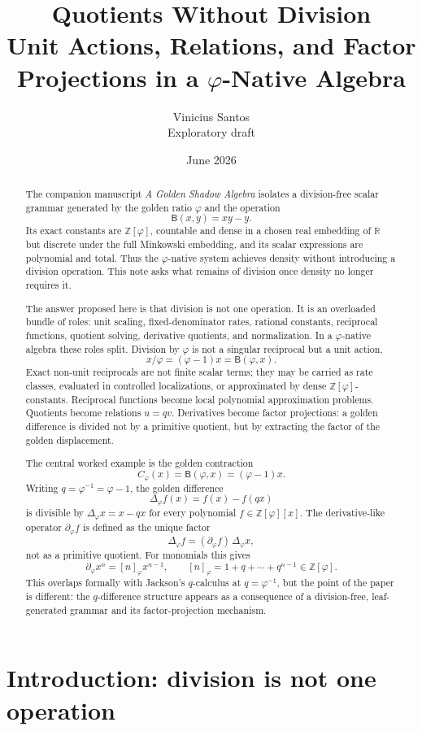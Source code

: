 \documentclass[11pt]{article}
\title{Quotients Without Division\\
\large Unit Actions, Relations, and Factor Projections in a $\varphi$-Native Algebra}
\author{Vinicius Santos\\
\small Exploratory draft}
\date{June 2026}
\newcommand{\B}{\mathsf{B}}
\newcommand{\ph}{\varphi}
\newcommand{\Z}{\mathbb{Z}}
\newcommand{\R}{\mathbb{R}}
\newcommand{\dd}{\Delta_\ph}
\newcommand{\pd}{\partial_\ph}
\newcommand{\Cphi}{C_\ph}
\begin{document}
\maketitle

\begin{abstract}
The companion manuscript \emph{A Golden Shadow Algebra} isolates a division-free scalar grammar generated by the golden ratio $\ph$ and the operation
\[
    \B(x,y)=xy-y.
\]
Its exact constants are $\Z[\ph]$, countable and dense in a chosen real embedding of $\R$ but discrete under the full Minkowski embedding, and its scalar expressions are polynomial and total.  Thus the $\ph$-native system achieves density without introducing a division operation.  This note asks what remains of division once density no longer requires it.

The answer proposed here is that division is not one operation.  It is an overloaded bundle of roles: unit scaling, fixed-denominator rates, rational constants, reciprocal functions, quotient solving, derivative quotients, and normalization.  In a $\ph$-native algebra these roles split.  Division by $\ph$ is not a singular reciprocal but a unit action,
\[
    x/\ph=(\ph-1)x=\B(\ph,x).
\]
Exact non-unit reciprocals are not finite scalar terms; they may be carried as rate classes, evaluated in controlled localizations, or approximated by dense $\Z[\ph]$-constants.  Reciprocal functions become local polynomial approximation problems.  Quotients become relations $u=qv$.  Derivatives become factor projections: a golden difference is divided not by a primitive quotient, but by extracting the factor of the golden displacement.

The central worked example is the golden contraction
\[
    \Cphi(x)=\B(\ph,x)=(\ph-1)x.
\]
Writing $q=\ph^{-1}=\ph-1$, the golden difference
\[
    \dd f(x)=f(x)-f(qx)
\]
is divisible by $\dd x=x-qx$ for every polynomial $f\in\Z[\ph][x]$.  The derivative-like operator $\pd f$ is defined as the unique factor
\[
    \dd f=(\pd f)\,\dd x,
\]
not as a primitive quotient.  For monomials this gives
\[
    \pd x^n=[n]_\ph x^{n-1},
    \qquad
    [n]_\ph=1+q+\cdots+q^{n-1}\in\Z[\ph].
\]
This overlaps formally with Jackson's $q$-calculus at $q=\ph^{-1}$, but the point of the paper is different: the $q$-difference structure appears as a consequence of a division-free, leaf-generated grammar and its factor-projection mechanism.
\end{abstract}

\tableofcontents

\section{Introduction: division is not one operation}
\end{document}

